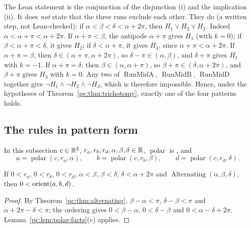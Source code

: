 \begin{remark}\label{pc:rem:runs}
The Lean statement is the conjunction of the disjunction (i) and the implication (ii). It does \emph{not} state
that the three runs exclude each other. They do (a written step, not Lean-checked): if
$\alpha<\beta<\delta<\alpha+2\pi$, then $H_1\vee H_2\vee H_3$. Indeed $\alpha<\alpha+\pi<\alpha+2\pi$. If
$\alpha+\pi<\beta$, the antipode $\alpha+\pi$ gives $H_1$ (with $k=0$); if $\beta<\alpha+\pi<\delta$, it gives $H_2$;
if $\delta<\alpha+\pi$, it gives $H_3$, since $\alpha+\pi<\alpha+2\pi$. If $\alpha+\pi=\beta$, then
$\delta\in(\alpha+\pi,\alpha+2\pi)$, so $\delta-\pi\in(\alpha,\beta)$, and $\delta+\pi$ gives $H_1$ with $k=-1$. If
$\alpha+\pi=\delta$, then $\beta\in(\alpha,\alpha+\pi)$, so $\beta+\pi\in(\delta,\alpha+2\pi)$, and $\beta+\pi$ gives
$H_3$ with $k=0$. Any two of $\operatorname{RunMidA}$, $\operatorname{RunMidB}$, $\operatorname{RunMidD}$ together
give $\neg H_1\wedge\neg H_2\wedge\neg H_3$, which is therefore impossible. Hence, under the hypotheses of
Theorem~\ref{pc:thm:trichotomy}, exactly one of the four patterns holds.
\end{remark}

\subsection{The rules in pattern form}

In this subsection $c\in\mathbb R^2$, $r_a,r_b,r_d,\alpha,\beta,\delta\in\mathbb R$, $\operatorname{polar}$ is
, and
\[
  a=\operatorname{polar}(c,r_a,\alpha),\qquad b=\operatorname{polar}(c,r_b,\beta),\qquad d=\operatorname{polar}(c,r_d,\delta).
\]

\begin{theorem}\label{pc:thm:rule-alt}
If $0<r_a$, $0<r_b$, $0<r_d$, $\alpha<\beta$, $\beta<\delta$, $\delta<\alpha+2\pi$ and
$\operatorname{Alternating}(\alpha,\beta,\delta)$, then $0<\operatorname{orient}(a,b,d)$.
\end{theorem}

\begin{proof}
By Theorem~\ref{pc:thm:alternating}, $\beta-\alpha<\pi$, $\delta-\beta<\pi$ and $\alpha+2\pi-\delta<\pi$; the
ordering gives $0<\beta-\alpha$, $0<\delta-\beta$ and $0<\alpha-\delta+2\pi$. Lemma~\ref{pc:lem:polar-facts}(c)
applies.
\end{proof}

